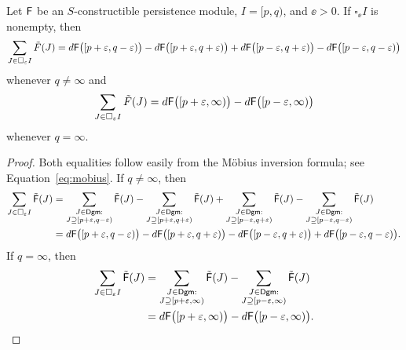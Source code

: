 \documentclass[12pt]{article}
\begin{document}
\begin{lem}
\label{lem:corners}
Let ${\mathsf{F}}$ be an $S$-constructible persistence module, $I = [p,q)$, and $\ee > 0$.
If $\square_\ee I$ is nonempty, then
	\begin{equation*}
	\label{eq:sum}
	\sum_{J \in \square_\varepsilon I} \tilde{F}(J) = d {\mathsf{F}} \big( [p+\varepsilon, q-\varepsilon) \big) - 
	d {\mathsf{F}} \big( [p+\varepsilon, q+\varepsilon) \big) 
	+ d {\mathsf{F}} \big( [p-\varepsilon, q+\varepsilon) \big) - d {\mathsf{F}} \big( [p-\varepsilon, q-\varepsilon) \big)
	\end{equation*}
whenever $q \neq \infty$ and
	\begin{equation*}
	\label{eq:sum}
	\sum_{J \in \square_\varepsilon I} \tilde{F}(J) = d {\mathsf{F}} \big( [p+\varepsilon, \infty) \big) 
	- d {\mathsf{F}} \big( [p-\varepsilon, \infty) \big)
	\end{equation*}
whenever $q = \infty$.
\end{lem}

\begin{proof}
Both equalities follow easily from the M\"obius inversion formula; see Equation~\ref{eq:mobius}.
If $q \neq \infty$, then
	\begin{align*}
	\sum_{J \in \square_\varepsilon I} \tilde {{\mathsf{F}}}(J) &= \sum_{\substack{J \in {\mathsf{Dgm}}: \\ J \supseteq [p+\varepsilon,q-\varepsilon)}} 
	\tilde {{\mathsf{F}}}(J)
	- \sum_{\substack{J \in {\mathsf{Dgm}}: \\ J \supseteq [p+\varepsilon, q+\varepsilon)}} \tilde {{\mathsf{F}}}(J) +
	\sum_{\substack{J \in {\mathsf{Dgm}}: \\ J \supseteq [p-\varepsilon, q+\varepsilon)}} \tilde {{\mathsf{F}}}(J) - 
	\sum_{\substack{J \in {\mathsf{Dgm}}: \\ J \supseteq [p-\varepsilon, q-\varepsilon)} } \tilde {{\mathsf{F}}}(J) \\
	& = d {\mathsf{F}} \big( [p+\varepsilon,q-\varepsilon) \big) - d {\mathsf{F}} \big( [p+\varepsilon,q+\varepsilon) \big) - 
	d {\mathsf{F}} \big( [p-\varepsilon,q+\varepsilon) \big) + d {\mathsf{F}} \big( [p-\varepsilon,q-\varepsilon) \big).
	\end{align*}
If $q = \infty$, then
	\begin{align*}
	\sum_{J \in \square_\varepsilon I} \tilde {{\mathsf{F}}}(J) &= \sum_{\substack{J \in {\mathsf{Dgm}}: \\ J 
	\supseteq [p+\varepsilon,\infty)}} \tilde {{\mathsf{F}}}(J)
	- \sum_{\substack{J \in {\mathsf{Dgm}}: \\ J \supseteq [p-\varepsilon, \infty)}} \tilde {{\mathsf{F}}}(J) \\
	& = d {\mathsf{F}} \big( [p+\varepsilon,\infty) \big) - d {\mathsf{F}} \big( [p-\varepsilon,\infty) \big).
	\end{align*}
\end{proof}
\end{document}
